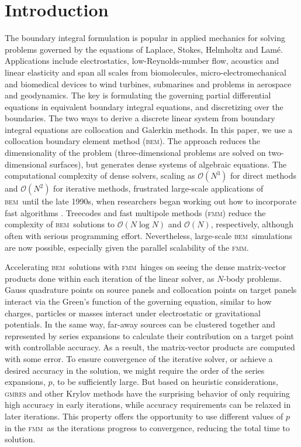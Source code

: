 \documentclass[smallcondensed,final]{svjour3}
\newcommand{\bem}{\textsc{bem}\xspace}
\newcommand{\fmm}{\textsc{fmm}\xspace}
\renewcommand{\O}[1]{\mathcal{O}(#1)}
\newcommand{\gmres}{\textsc{gmres}\xspace}
\begin{document}
\section{Introduction}

The boundary integral formulation is popular in applied mechanics for solving problems governed by the equations of Laplace, Stokes, Helmholtz and Lam{\'e}. Applications include electrostatics, low-Reynolds-number flow, acoustics and linear elasticity and span all scales from biomolecules, micro-electromechanical and biomedical devices to wind turbines, submarines and  problems in aerospace and geodynamics. The key is formulating the governing partial differential equations in equivalent boundary integral equations, and discretizing over the boundaries. 
The two ways to derive a discrete linear system from boundary integral equations are collocation and Galerkin methods.
In this paper, we use a collocation boundary element method (\bem).
The approach reduces the dimensionality of the problem (three-dimensional problems are solved on two-dimensional surfaces), but generates dense systems of algebraic equations. 
The computational complexity of dense solvers, scaling as $\O{N^3}$ for direct methods and $\O{N^2}$ for iterative methods, frustrated large-scale applications of \bem\ until the late 1990s, when researchers began working out how to incorporate fast algorithms 
\cite{Nishimura2002,Liu2006}. Treecodes and fast multipole methods (\fmm) reduce the complexity of \bem\ solutions to $\O{N \log N}$ and $\O{N}$, respectively, although often with serious programming effort. Nevertheless, large-scale \bem\ simulations are now possible, especially given the parallel scalability of the \fmm \cite{YokotaETal2011a,YokotaBarba2011a}.

Accelerating \bem\ solutions with \fmm\ hinges on seeing the dense matrix-vector products done within each iteration of the linear solver, as $N$-body problems. Gauss quadrature points on source panels and collocation points on target panels interact via the Green's function of the governing equation, similar to how charges, particles or masses interact under electrostatic or gravitational potentials. In the same way, far-away sources can be clustered together and represented by series expansions to calculate their contribution on a target point with controllable accuracy. As a result, the matrix-vector products are computed with some error. To ensure convergence of the iterative solver, or achieve a desired accuracy in the solution, we might require the order of the series expansions, $p$, to be sufficiently large. But based on heuristic considerations, \gmres and other Krylov methods have the surprising behavior of only requiring high accuracy in early iterations, while accuracy requirements can be relaxed in later iterations. This property offers the opportunity to use different values of $p$ in the \fmm\ as the iterations progress to convergence, reducing the total time to solution.
\end{document}
